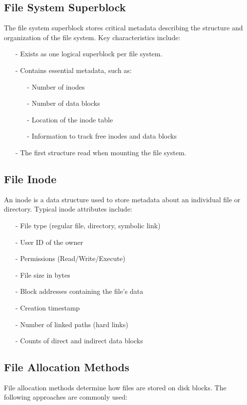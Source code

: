 \documentclass[../../compsys.tex]{subfiles}
\begin{document}
\subsection{File System Superblock}
The file system superblock stores critical metadata describing the structure and organization of the file system. Key characteristics include:
\begin{itemize}[itemsep=2pt, topsep=1pt]
    \item[-] Exists as one logical superblock per file system.
    \item[-] Contains essential metadata, such as:
    \begin{itemize}
        \item[-] Number of inodes
        \item[-] Number of data blocks
        \item[-] Location of the inode table
        \item[-] Information to track free inodes and data blocks
    \end{itemize}
    \item[-] The first structure read when mounting the file system.
\end{itemize}
\newpage
\subsection{File Inode}
An inode is a data structure used to store metadata about an individual file or directory. Typical inode attributes include:
\begin{itemize}[itemsep=2pt, topsep=1pt]
    \item[-] File type (regular file, directory, symbolic link)
    \item[-] User ID of the owner
    \item[-] Permissions (Read/Write/Execute)
    \item[-] File size in bytes
    \item[-] Block addresses containing the file's data
    \item[-] Creation timestamp
    \item[-] Number of linked paths (hard links)
    \item[-] Counts of direct and indirect data blocks
\end{itemize}

\subsection{File Allocation Methods}
File allocation methods determine how files are stored on disk blocks. The following approaches are commonly used:
\end{document}
